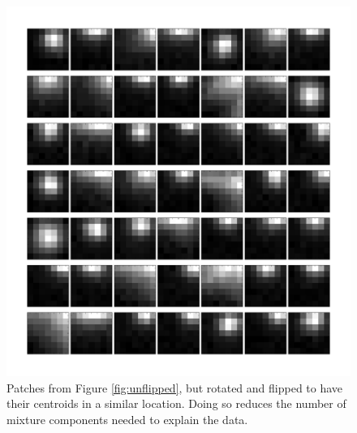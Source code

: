 \documentclass[letterpaper,12pt]{article}
\begin{document}
\begin{figure}
\includegraphics[clip=true, trim=0cm 0cm 0.0cm 0.cm,width=12cm]{figures/flipped.pdf}
\caption{Patches from Figure \ref{fig:unflipped}, but rotated and flipped to 
have their centroids in a similar location.  Doing so reduces the number 
of mixture components needed to explain the data.}
\label{fig:flipped}
\end{figure}
\end{document}
